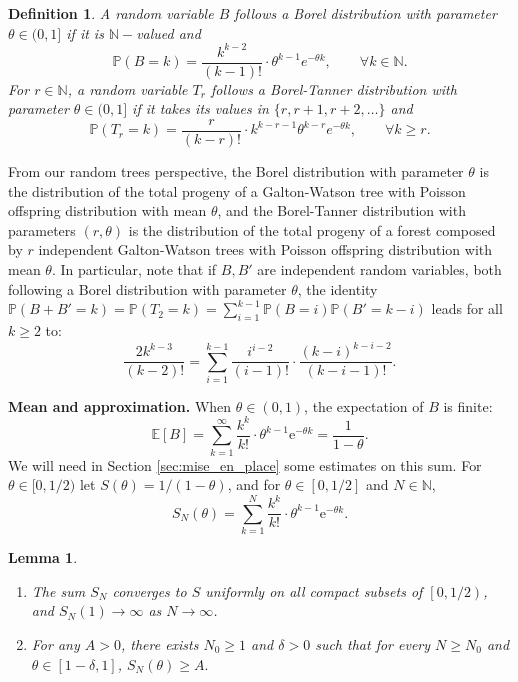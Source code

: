 \documentclass[a4, 11pt]{article}
\numberwithin{equation}{section}
\theoremstyle{plain}
\newtheorem{lemma}[theorem]{Lemma}
\newtheorem{definition}[theorem]{Definition}
\theoremstyle{definition}
\theoremstyle{remark}
\begin{document}
\begin{definition} A random variable $B$  follows a \emph{Borel distribution} with parameter $\theta \in (0,1]$ if it is $\mathbb N-$valued and
$$
\mathbb P(B=k)=\frac{k^{k-2}}{(k-1)!}\cdot \theta^{k-1} e^{-\theta k}, \qquad \forall k \in \mathbb N.
$$
For $r \in \mathbb N$, a random variable $T_r$  follows a \emph{Borel-Tanner distribution} with parameter $\theta \in (0,1]$ if it takes its values in $\{r,r+1,r+2, \ldots\}$ and
$$
\mathbb P(T_r=k)=\frac{r}{(k-r)!}\cdot k^{k-r-1}\theta^{k-r} e^{-\theta k}, \qquad \forall k\geq r.
$$
\end{definition}

From our random trees perspective, the Borel distribution with parameter $\theta$ is the distribution of the total progeny of a Galton-Watson tree with Poisson offspring distribution with mean $\theta$, and the Borel-Tanner distribution with parameters $(r,\theta)$  is the distribution of the total progeny of a forest composed by $r$ independent Galton-Watson trees with Poisson offspring distribution with mean $\theta$. In particular, note that if $B,B'$ are independent random variables, both following a Borel distribution with parameter $\theta$, the identity  $\mathbb P(B+B'=k)=\mathbb P(T_2=k)=\sum_{i=1}^{k-1}\mathbb P(B=i)\mathbb P(B'=k-i)$ leads for all $k\geq 2$ to:
\begin{equation}
\label{eq:ijk}
\frac{2 k^{k-3}}{(k-2)!}=\sum_{i=1}^{k-1} \frac{i^{i-2}}{(i-1)!} \cdot \frac{(k-i)^{k-i-2}}{(k-i-1)!}.
\end{equation}

\bigskip


\textbf{Mean and approximation.} When $\theta \in (0,1)$, the expectation of $B$ is finite:
\begin{equation}
\label{lm:Borel:law}
\mathbb E[B]=\sum_{k=1}^{\infty}\frac{k^k}{k!} \cdot \theta^{k-1}\mathrm{e}^{-\theta k}=\frac{1}{1-\theta}.
\end{equation}
We will need in Section \ref{sec:mise_en_place} some estimates on this sum. For $\theta \in [0,1/2)$ let $S(\theta)={1}/{(1-\theta)}$, and for $\theta \in [0,1/2]$ and $N\in \mathbb N$, 
\begin{equation}
		S_N(\theta)=\sum_{k= 1}^N\frac{k^k}{k!}\cdot \theta^{k-1}\mathrm{e}^{-\theta k}. \label{def:S_N}
\end{equation}

\medskip

\begin{lemma}\label{lm:partial_sum}
\begin{enumerate}[topsep=0cm, itemsep=0cm]
\item[\emph{1)}] The sum $S_N$ converges to $S$ uniformly on all compact subsets of $\left[0,1/2\right)$, and $S_N\left(1\right)\to \infty$ as $N \rightarrow \infty$.
\item[\emph{2)}] For any $A>0$, there exists $N_0\geq 1$ and $\delta>0$ such that for every $N\geq N_0$ and $\theta \in \left[1-\delta,1\right]$, $S_N(\theta)\geq A.$
\end{enumerate}
\end{lemma}
\end{document}
